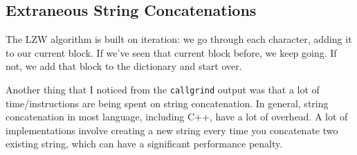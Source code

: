 \documentclass[12pt,twoside]{reedthesis}
\begin{document}
\hypertarget{extraneous-string-concatenations}{%
\subsection{Extraneous String Concatenations}\label{extraneous-string-concatenations}}

The LZW algorithm is built on iteration: we go through each character, adding it to our current block. If we've seen that current block before, we keep going. If not, we add that block to the dictionary and start over.

Another thing that I noticed from the \texttt{callgrind} output was that a lot of time/instructions are being spent on string concatenation. In general, string concatenation in most language, including C++, have a lot of overhead. A lot of implementations involve creating a new string every time you concatenate two existing string, which can have a significant performance penalty.
\end{document}
